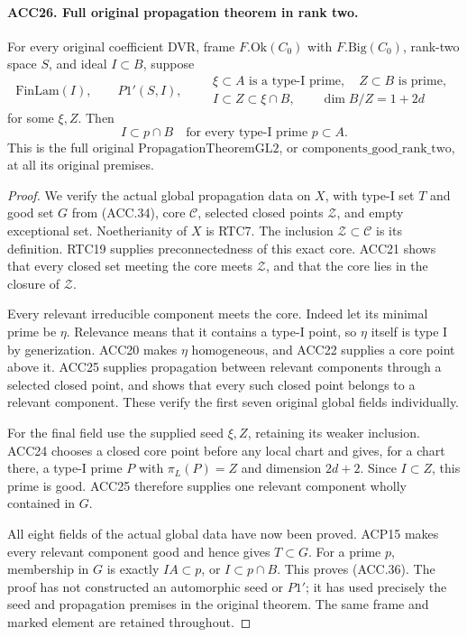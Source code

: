 \documentclass[11pt,a4paper]{article}
\numberwithin{equation}{section}
\theoremstyle{remark}\newtheorem{remark}[theorem]{Remark}
\begin{document}
\paragraph{ACC26. Full original propagation theorem in rank two.}
\label{claim:ACC26}
For every original coefficient DVR, frame \(F.\mathrm{Ok}(C_0)\)
with \(F.\mathrm{Big}(C_0)\), rank-two space \(S\), and
ideal \(I\subset B\), suppose
\[
 \mathrm{FinLam}(I),\qquad P1'(S,I),\qquad
 \begin{gathered}
 \xi\subset A\text{ is a type-I prime},\quad Z\subset B\text{ is prime},\\
 I\subset Z\subset\xi\cap B,\qquad \dim B/Z=1+2d
 \end{gathered}                                             \tag{ACC.35}
\]
for some \(\xi,Z\).  Then
\[
             I\subset p\cap B
       \quad\text{for every type-I prime }p\subset A.     \tag{ACC.36}
\]
This is the full original \(\mathrm{PropagationTheoremGL2}\),
or \(\mathrm{components\_\allowbreak good\_\allowbreak rank\_\allowbreak two}\), at all its
original premises.

\begin{proof}
We verify the actual global propagation data on \(X\), with
type-I set \(T\) and good set \(G\) from (ACC.34), core
\(\mathcal C\), selected closed points \(\mathcal Z\), and
empty exceptional set.  Noetherianity of \(X\) is RTC7.
The inclusion \(\mathcal Z\subset\mathcal C\) is its definition.
RTC19 supplies preconnectedness of this exact core.  ACC21 shows
that every closed set meeting the core meets \(\mathcal Z\),
and that the core lies in the closure of \(\mathcal Z\).

Every relevant irreducible component meets the core.  Indeed let
its minimal prime be \(\eta\).  Relevance means that it contains
a type-I point, so \(\eta\) itself is type I by generization.
ACC20 makes \(\eta\) homogeneous, and ACC22 supplies a core
point above it.  ACC25 supplies propagation between relevant
components through a selected closed point, and shows that every
such closed point belongs to a relevant component.  These verify
the first seven original global fields individually.

For the final field use the supplied seed \(\xi,Z\), retaining
its weaker inclusion.  ACC24 chooses a closed core point before
any local chart and gives, for a chart there, a type-I prime \(P\)
with \(\pi_L(P)=Z\) and dimension \(2d+2\).  Since
\(I\subset Z\), this prime is good.  ACC25 therefore supplies
one relevant component wholly contained in \(G\).

All eight fields of the actual global data have now been proved.
ACP15 makes every relevant component good and hence gives
\(T\subset G\).  For a prime \(p\), membership in \(G\)
is exactly \(IA\subset p\), or \(I\subset p\cap B\).
This proves (ACC.36).  The proof has not constructed an automorphic
seed or \(P1'\); it has used precisely the seed and propagation
premises in the original theorem.  The same frame and marked
element are retained throughout.
\end{proof}
\end{document}
